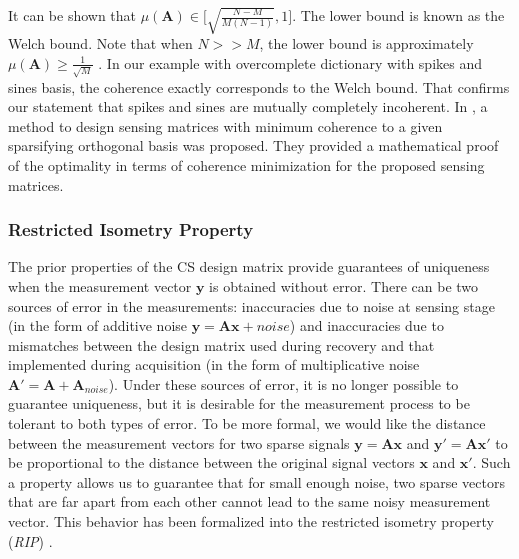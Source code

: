 \documentclass[journal]{IEEEtran}
\begin{document}

It can be shown that $\mu(\boldsymbol{A})\in \big[\sqrt{\frac{N-M}{M(N-1)}}, 1\big]$. The lower bound is known as the Welch bound. Note that when $N>>M$, the lower bound is approximately $\mu(\boldsymbol{A})\geq \frac{1}{\sqrt{M}}$ \cite{donoho2003optimally}. In our example with overcomplete dictionary with spikes and sines basis, the coherence exactly corresponds to the Welch bound. That confirms our statement that spikes and sines are mutually completely incoherent. In \cite{Pereira2014}, a method to design sensing matrices with minimum coherence to a given sparsifying orthogonal basis was proposed. They provided a mathematical proof of the optimality in terms of coherence minimization for the proposed sensing matrices.

\subsubsection{Restricted Isometry Property}
The prior properties of the CS design matrix provide guarantees of uniqueness when the measurement vector $\boldsymbol{y}$ is obtained without error. There can be two sources of error in the measurements: inaccuracies due to noise at sensing stage (in the form of additive noise $\boldsymbol{y}=\boldsymbol{A}\boldsymbol{x}+noise$) and inaccuracies due to mismatches between the design matrix used during recovery and that implemented during acquisition (in the form of multiplicative noise $\boldsymbol{A'}=\boldsymbol{A}+\boldsymbol{A}_{noise}$). Under these sources of error, it is no longer possible to guarantee uniqueness, but it is desirable for the measurement process to be tolerant to both types of error. To be more formal, we would like the distance between the measurement vectors for two sparse signals $\boldsymbol{y}=\boldsymbol{A}\boldsymbol{x}$ and $\boldsymbol{y'}=\boldsymbol{A}\boldsymbol{x'}$ to be proportional to the distance between the original signal vectors $\boldsymbol{x}$ and $\boldsymbol{x'}$. Such a property allows us to guarantee that for small enough noise, two sparse vectors that are far apart from each other cannot lead to the same noisy measurement vector. This behavior has been formalized into the restricted isometry property (\textit{RIP}) \cite{Moreira2014, Romberg2013, CANDES2008589, Blanchard2011}. 
\end{document}
